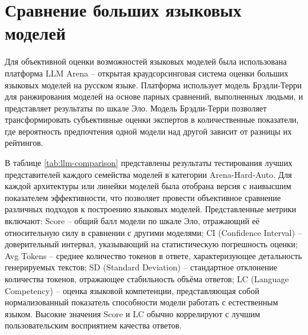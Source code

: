 \section{Сравнение больших языковых моделей}

Для объективной оценки возможностей языковых моделей была использована платформа LLM Arena -- открытая краудсорсинговая система оценки больших языковых моделей на русском языке. Платформа использует модель Брэдли-Терри для ранжирования моделей на основе парных сравнений, выполненных людьми, и представляет результаты по шкале Эло. Модель Брэдли-Терри позволяет трансформировать субъективные оценки экспертов в количественные показатели, где вероятность предпочтения одной модели над другой зависит от разницы их рейтингов.

В таблице \ref{tab:llm-comparison} представлены результаты тестирования лучших представителей каждого семейства моделей в категории Arena-Hard-Auto. Для каждой архитектуры или линейки моделей была отобрана версия с наивысшим показателем эффективности, что позволяет провести объективное сравнение различных подходов к построению языковых моделей. Представленные метрики включают: Score -- общий балл модели по шкале Эло, отражающий её относительную силу в сравнении с другими моделями; CI (Confidence Interval) -- доверительный интервал, указывающий на статистическую погрешность оценки; Avg Tokens -- среднее количество токенов в ответе, характеризующее детальность генерируемых текстов; SD (Standard Deviation) -- стандартное отклонение количества токенов, отражающее стабильность объёма ответов; LC (Language Competency) -- оценка языковой компетенции, представляющая собой нормализованный показатель способности модели работать с естественным языком. Высокие значения Score и LC обычно коррелируют с лучшим пользовательским восприятием качества ответов. \cite{llmarena}

